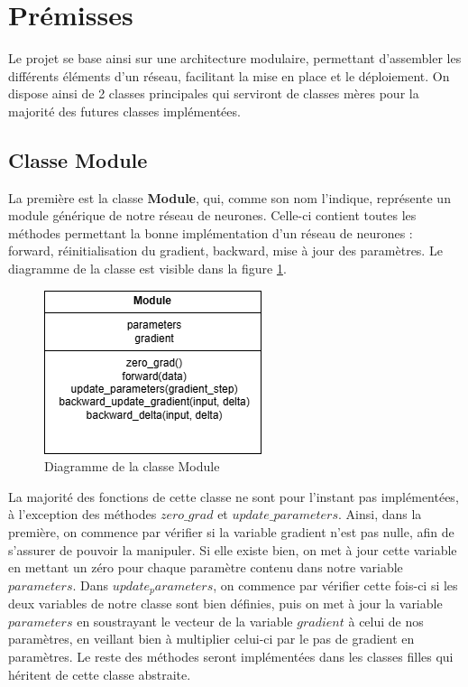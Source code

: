\documentclass{article}
\begin{document}
\section{Prémisses}

Le projet se base ainsi sur une architecture modulaire, permettant d'assembler les différents éléments d'un réseau, facilitant la mise en place et le déploiement. On dispose ainsi de 2 classes principales qui serviront de classes mères pour la majorité des futures classes implémentées.
\subsection{Classe Module}
La première est la classe \textbf{Module}, qui, comme son nom l'indique, représente un module générique de notre réseau de neurones. Celle-ci contient toutes les méthodes permettant la bonne implémentation d'un réseau de neurones : forward, réinitialisation du gradient, backward, mise à jour des paramètres. Le diagramme de la classe est visible dans la figure \ref{fig:module}.

\begin{figure}[H]
    \centering
    \includegraphics[width=0.4\linewidth]{Images/module.png}
    \caption{Diagramme de la classe Module}
    \label{fig:module}
\end{figure}

La majorité des fonctions de cette classe ne sont pour l'instant pas implémentées, à l'exception des méthodes $zero\_grad$ et $update\_parameters$. Ainsi, dans la première, on commence par vérifier si la variable gradient n'est pas nulle, afin de s'assurer de pouvoir la manipuler. Si elle existe bien, on met à jour cette variable en mettant un zéro pour chaque paramètre contenu dans notre variable $parameters$. 
Dans $update_parameters$, on commence par vérifier cette fois-ci si les deux variables de notre classe sont bien définies, puis on met à jour la variable $parameters$ en soustrayant le vecteur de la variable $gradient$ à celui de nos paramètres, en veillant bien à multiplier celui-ci par le pas de gradient en paramètres.
Le reste des méthodes seront implémentées dans les classes filles qui héritent de cette classe abstraite.
\end{document}
